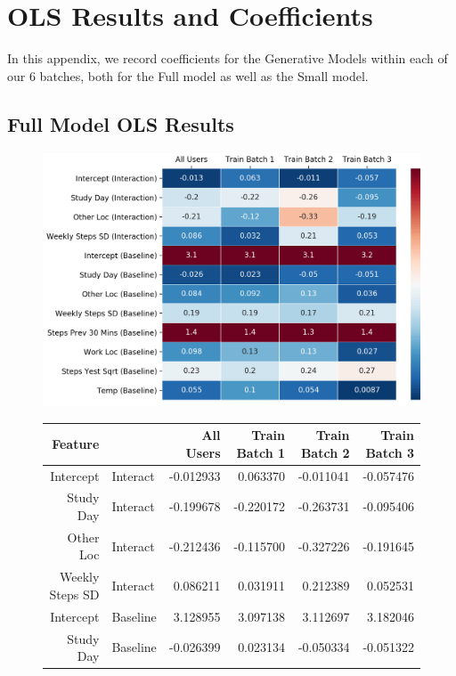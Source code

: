 \chapter{OLS Results and Coefficients}
\label{AppendixC}

In this appendix, we record coefficients for the Generative Models within each of our $6$ batches, both for the Full model as well as the Small model.


\section{Full Model OLS Results}

\begin{figure}
\includegraphics[width=\textwidth]{figures/full_model_coefs_table.png}
\begin{tabular}{rl|rrrr}
\toprule
Feature & {} &  All Users &  Train Batch 1 &  Train Batch 2 &  Train Batch 3 \\
\midrule
Intercept & Interact       &  -0.012933 &       0.063370 &      -0.011041 &      -0.057476 \\
Study Day & Interact       &  -0.199678 &      -0.220172 &      -0.263731 &      -0.095406 \\
Other Loc & Interact       &  -0.212436 &      -0.115700 &      -0.327226 &      -0.191645 \\
Weekly Steps SD & Interact &   0.086211 &       0.031911 &       0.212389 &       0.052531 \\
\hline
Intercept & Baseline          &   3.128955 &       3.097138 &       3.112697 &       3.182046 \\
Study Day & Baseline          &  -0.026399 &       0.023134 &      -0.050334 &      -0.051322 \\

\end{tabular}
\end{figure}
